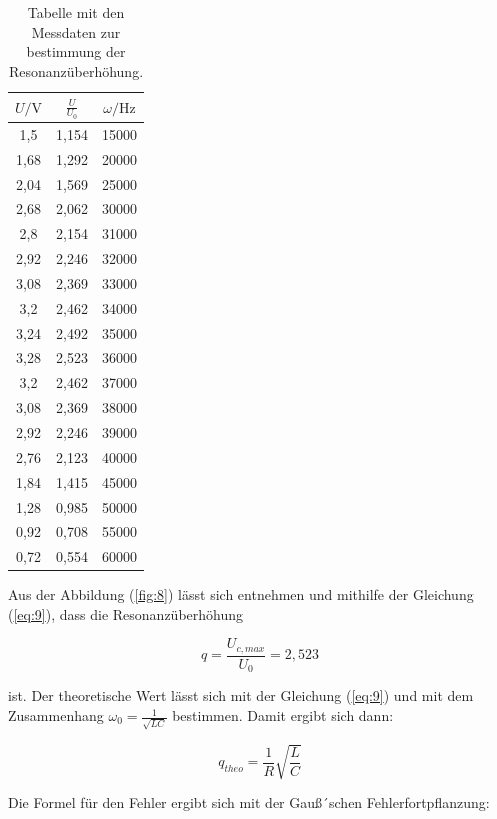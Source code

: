 \begin{table}[H]
  \centering
  \caption{Tabelle mit den Messdaten zur bestimmung der Resonanzüberhöhung.}
  \label{tab:2}
  \begin{tabular}{c c c}
    \toprule
    $U/\si{\V}$ & $\frac{U}{U_0}$ & $ \omega / \si{\Hz}$ \\
    \midrule
    1,5  & 1,154 &  15000 \\
    1,68 & 1,292 &  20000 \\
    2,04 & 1,569 &  25000 \\
    2,68 & 2,062 &  30000 \\
    2,8  & 2,154 &  31000 \\
    2,92 & 2,246 &  32000 \\
    3,08 & 2,369 &  33000 \\
    3,2  & 2,462 &  34000 \\
    3,24 & 2,492 &  35000 \\
    3,28 & 2,523 &  36000 \\
    3,2  & 2,462 &  37000 \\
    3,08 & 2,369 &  38000 \\
    2,92 & 2,246 &  39000 \\
    2,76 & 2,123 &  40000 \\
    1,84 & 1,415 &  45000 \\
    1,28 & 0,985 &  50000 \\
    0,92 & 0,708 &  55000 \\
    0,72 & 0,554 &  60000 \\
    \bottomrule
  \end{tabular}
\end{table}

Aus der Abbildung (\ref{fig:8}) lässt sich entnehmen und mithilfe der Gleichung (\ref{eq:9}),
dass die Resonanzüberhöhung

\begin{equation*}
  q = \frac{U_{c,max}}{U_0} = 2,523
\end{equation*}

ist. Der theoretische Wert lässt sich mit der Gleichung (\ref{eq:9}) und mit dem Zusammenhang
$\omega_0 = \frac{1}{\sqrt{LC}}$ bestimmen. Damit ergibt sich dann:

\begin{equation*}
  q_{theo} = \frac{1}{R} \sqrt{\frac{L}{C}}
\end{equation*}

Die Formel für den Fehler ergibt sich mit der Gauß´schen Fehlerfortpflanzung:

